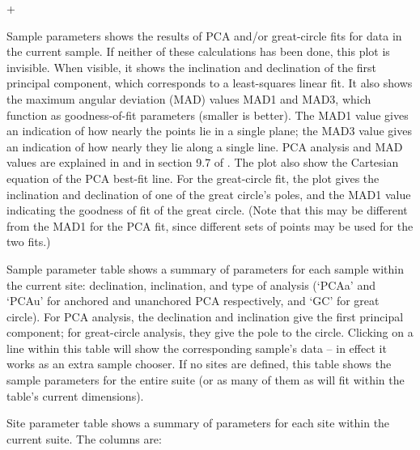 \documentclass[a4paper,british]{article}
\newcommand{\menuitemlabel}[1]{%
\mbox{\textsf{#1}}\hfil}
\newenvironment{menuitemlist}%
{\begin{list}{}{%
\renewcommand{\makelabel}{\menuitemlabel}%
\setlength{\labelwidth}{35pt}%
\setlength{\leftmargin}%
             {\labelwidth+\labelsep}}}%
{\end{list}}
\newcommand{\caps}[1]{\MakeTextUppercase{#1}} %
\begin{document}
\begin{menuitemlist}
\item[Sample parameters] shows the results of \caps{pca} and/or great-circle
  fits for data in the current sample. If neither of these calculations has
  been done, this plot is invisible. When visible, it shows the inclination
  and declination of the first principal component, which corresponds to a
  least-squares linear fit. It also shows the maximum angular deviation
  (\caps{mad}) values \caps{mad}1 and \caps{mad}3, which function as
  goodness-of-fit parameters (smaller is better). The \caps{mad}1 value gives
  an indication of how nearly the points lie in a single plane; the
  \caps{mad}3 value gives an indication of how nearly they lie along a single
  line. \caps{Pca} analysis and \caps{mad} values are explained in
  \cite{kirschvink1980least} and in section 9.7 of
  \cite{tauxe2010paleomagnetism}. The plot also show the Cartesian equation
  of the \caps{pca} best-fit line. For the great-circle fit, the plot gives the
  inclination and declination of one of the great circle's poles, and the
  \caps{mad}1 value indicating the goodness of fit of the great circle. (Note
  that this may be different from the \caps{mad}1 for the \caps{pca} fit,
  since different sets of points may be used for the two fits.)

\item[Sample parameter table] shows a summary of parameters for each
  sample within the current site: declination, inclination, and type of
  analysis (`\caps{pca}a' and `\caps{pca}u' for anchored and unanchored
  \caps{pca} respectively, and `GC' for great circle). For \caps{pca}
  analysis, the declination and inclination give the first principal
  component; for great-circle analysis, they give the pole to the
  circle. Clicking on a line within this table will show the
  corresponding sample's data -- in effect it works as an extra sample
  chooser. If no sites are defined, this table shows the sample
  parameters for the entire suite (or as many of them as will fit within
  the table's current dimensions).

\item[Site parameter table] shows a summary of parameters for each site
  within the current suite. The columns are:


\end{menuitemlist}
\end{document}
